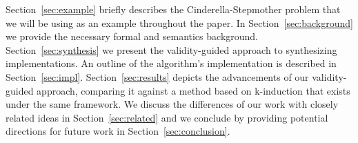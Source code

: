 
Section~\ref{sec:example} briefly describes the Cinderella-Stepmother problem that we will be using as an example throughout the paper. In Section~\ref{sec:background} we provide the necessary formal and semantics background. Section~\ref{sec:synthesis} we present the validity-guided approach to synthesizing implementations.
An outline of the algorithm's implementation is described in Section~\ref{sec:impl}. Section~\ref{sec:results} depicts the advancements of our validity-guided
approach, comparing it against a method based on k-induction that exists under the same framework. We discuss the differences of our work with closely related ideas in Section~\ref{sec:related} and we conclude by providing potential directions for future work in Section~\ref{sec:conclusion}.

	
